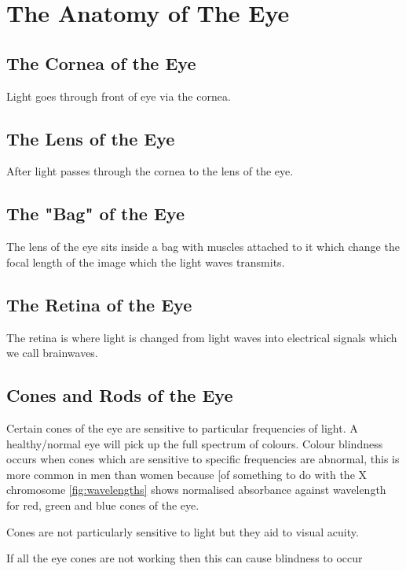 
\chapter{The Anatomy of The Eye}

\label{anatomy} %


\section{The Cornea of the Eye}

Light goes through front of eye via the cornea. 

\section{The Lens of the Eye}
After light passes through the cornea to the lens of the eye.

\section{The "Bag" of the Eye}
The lens of the eye sits inside a bag with muscles attached to it which change
the focal length of the image which the light waves transmits.

\section{The Retina of the Eye}
The retina is where light is changed from light waves into electrical signals
which we call brainwaves.

\section{Cones and Rods of the Eye}

Certain cones of the eye are sensitive to particular frequencies of light.
A healthy/normal eye will pick up the full spectrum of colours. Colour blindness
occurs when cones which are sensitive to specific frequencies are abnormal, this
is more common in men than women because [of something to do with the X
chromosome\cite{gardner2010x} \ref{fig:wavelengths} shows normalised absorbance
against wavelength for red, green and blue cones of the eye.

Cones are not particularly sensitive to light but they aid to visual acuity.
\cite{}

If all the eye cones are not working then this can cause
blindness to occur\cite{}
